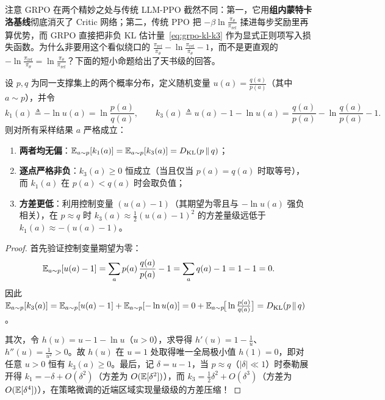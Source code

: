 注意 GRPO 在两个精妙之处与传统 LLM-PPO 截然不同：第一，它用\textbf{组内蒙特卡洛基线}彻底消灭了 Critic 网络；第二，传统 PPO 把 $-\beta \ln \frac{\pi_\theta}{\pi_{\mathrm{ref}}}$ 揉进每步奖励里再算优势，而 GRPO 直接把非负 KL 估计量~\eqref{eq:grpo-kl-k3} 作为显式正则项写入损失函数。为什么非要用这个看似绕口的 $\frac{\pi_{\mathrm{ref}}}{\pi_\theta} - \ln \frac{\pi_{\mathrm{ref}}}{\pi_\theta} - 1$，而不是更直观的 $-\ln \frac{\pi_{\mathrm{ref}}}{\pi_\theta} = \ln \frac{\pi_\theta}{\pi_{\mathrm{ref}}}$？下面的短小命题给出了天书级的回答。

\begin{thmBox}
\begin{proposition}
\label{prop:kl-k3}
设 $p, q$ 为同一支撑集上的两个概率分布，定义随机变量 $u(a) = \frac{q(a)}{p(a)}$（其中 $a \sim p$），并令
\[
  k_1(a) \triangleq -\ln u(a) = \ln \frac{p(a)}{q(a)}, \qquad
  k_3(a) \triangleq u(a) - 1 - \ln u(a) = \frac{q(a)}{p(a)} - \ln \frac{q(a)}{p(a)} - 1.
\]
则对所有采样结果 $a$ 严格成立：
\begin{enumerate}
  \item \textbf{两者均无偏}：$\mathbb{E}_{a \sim p}[k_1(a)] = \mathbb{E}_{a \sim p}[k_3(a)] = D_{\mathrm{KL}}(p \,\|\, q)$；
  \item \textbf{逐点严格非负}：$k_3(a) \ge 0$ 恒成立（当且仅当 $p(a) = q(a)$ 时取等号），而 $k_1(a)$ 在 $p(a) < q(a)$ 时会取负值；
  \item \textbf{方差更低}：利用控制变量 $(u(a) - 1)$（其期望为零且与 $-\ln u(a)$ 强负相关），在 $p \approx q$ 时 $k_3(a) \approx \frac{1}{2}(u(a)-1)^2$ 的方差量级远低于 $k_1(a) \approx -(u(a)-1)$。
\end{enumerate}
\end{proposition}
\begin{proof}
首先验证控制变量期望为零：
\[
  \mathbb{E}_{a \sim p}[u(a) - 1] = \sum_a p(a)\,\frac{q(a)}{p(a)} - 1 = \sum_a q(a) - 1 = 1 - 1 = 0.
\]
因此 $\mathbb{E}_{a \sim p}[k_3(a)] = \mathbb{E}_{a \sim p}[u(a) - 1] + \mathbb{E}_{a \sim p}[-\ln u(a)] = 0 + \mathbb{E}_{a \sim p}\!\big[\ln\frac{p(a)}{q(a)}\big] = D_{\mathrm{KL}}(p \,\|\, q)$。

其次，令 $h(u) = u - 1 - \ln u$（$u > 0$），求导得 $h'(u) = 1 - \frac{1}{u}$、$h''(u) = \frac{1}{u^2} > 0$。故 $h(u)$ 在 $u = 1$ 处取得唯一全局极小值 $h(1) = 0$，即对任意 $u > 0$ 恒有 $k_3(a) \ge 0$。最后，记 $\delta = u - 1$，当 $p \approx q$（$|\delta| \ll 1$）时泰勒展开得 $k_1 = -\delta + O(\delta^2)$（方差为 $O(\mathbb{E}[\delta^2])$），而 $k_3 = \frac{1}{2}\delta^2 + O(\delta^3)$（方差为 $O(\mathbb{E}[\delta^4])$），在策略微调的近端区域实现量级级的方差压缩！
\end{proof}
\end{thmBox}

